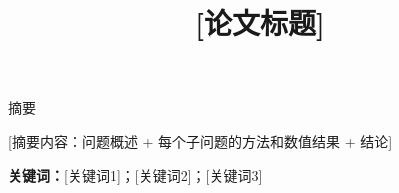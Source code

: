 \documentclass[12pt,a4paper]{ctexart}
\title{\heiti\zihao{2} [论文标题]}
\author{}
\date{}
\begin{document}
\maketitle
\thispagestyle{empty}

\begin{center}
{\heiti 摘\hspace{2em}要}
\end{center}
\vspace{0.5em}
\songti

[摘要内容：问题概述 + 每个子问题的方法和数值结果 + 结论]

\vspace{0.5em}
\noindent\textbf{关键词：}[关键词1]；[关键词2]；[关键词3]

\newpage
\tableofcontents
\clearpage












\appendix

\end{document}
